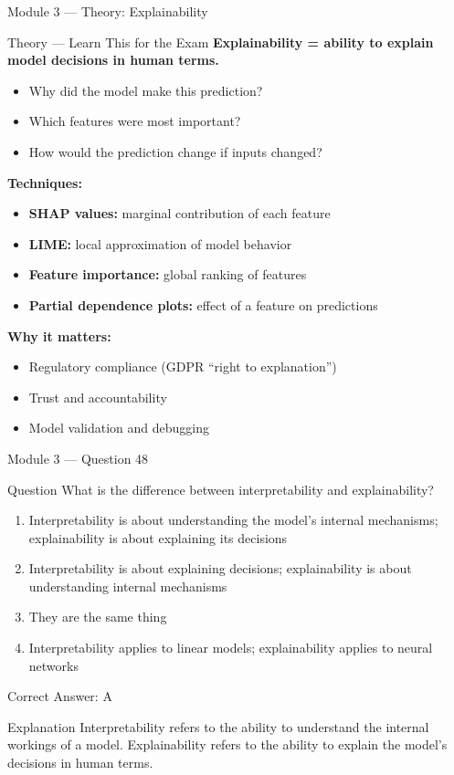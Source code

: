 \documentclass[aspectratio=169,10pt]{beamer}
\newcommand{\question}[1]{%
	\begin{block}{Question}
		#1
	\end{block}
}
\newcommand{\options}[4]{%
	\begin{enumerate}[label=\Alph*.,leftmargin=*]
		\item #1
		\item #2
		\item #3
		\item #4
	\end{enumerate}
}
\newcommand{\answerbox}[1]{%
	\begin{exampleblock}{Correct Answer: #1}
	\end{exampleblock}
}
\newcommand{\explain}[1]{%
	\begin{block}{Explanation}
		\small #1
	\end{block}
}
\newcommand{\theory}[1]{%
	\begin{block}{Theory --- Learn This for the Exam}
		\small #1
	\end{block}
}
\begin{document}
	\begin{frame}{Module 3 --- Theory: Explainability}
		\theory{
			\textbf{Explainability = ability to explain model decisions in human terms.}
			\begin{itemize}
				\item Why did the model make this prediction?
				\item Which features were most important?
				\item How would the prediction change if inputs changed?
			\end{itemize}
			\textbf{Techniques:}
			\begin{itemize}
				\item \textbf{SHAP values:} marginal contribution of each feature
				\item \textbf{LIME:} local approximation of model behavior
				\item \textbf{Feature importance:} global ranking of features
				\item \textbf{Partial dependence plots:} effect of a feature on predictions
			\end{itemize}
			\textbf{Why it matters:}
			\begin{itemize}
				\item Regulatory compliance (GDPR ``right to explanation'')
				\item Trust and accountability
				\item Model validation and debugging
			\end{itemize}
		}
	\end{frame}
	
	\begin{frame}{Module 3 --- Question 48}
		\question{What is the difference between interpretability and explainability?}
		\options{Interpretability is about understanding the model's internal mechanisms; explainability is about explaining its decisions}{Interpretability is about explaining decisions; explainability is about understanding internal mechanisms}{They are the same thing}{Interpretability applies to linear models; explainability applies to neural networks}
		\answerbox{A}
		\explain{Interpretability refers to the ability to understand the internal workings of a model. Explainability refers to the ability to explain the model's decisions in human terms.}
	\end{frame}
	
\end{document}
